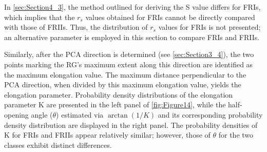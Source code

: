 \documentclass{aa}
\begin{document}
In \autoref{sec:Section4_3}, the method outlined for deriving the S value differs for FRIs, which implies that the $r_s$ values obtained for FRIs cannot be directly compared with those of FRIIs. Thus, the distribution of $r_s$ values for FRIs is not presented; an alternative parameter is employed in this section to compare FRIs and FRIIs.

Similarly, after the PCA direction is determined (see \autoref{sec:Section3_4}), the two points marking the RG’s maximum extent along this direction are identified as the maximum elongation value. The maximum distance perpendicular to the PCA direction, when divided by this maximum elongation value, yields the elongation parameter. Probability density distributions of the elongation parameter K are presented in the left panel of \autoref{fig:Figure14}, while the half-opening angle ($\theta$) estimated via $\arctan(1/K)$ and its corresponding probability density distribution are displayed in the right panel. The probability densities of K for FRIs and FRIIs appear relatively similar; however, those of $\theta$ for the two classes exhibit distinct differences.

\end{document}
